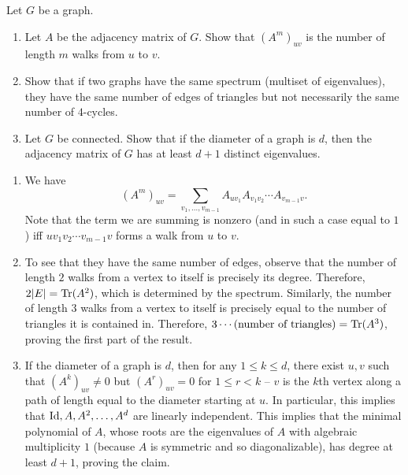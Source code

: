 \documentclass{article}
\begin{document}
	\begin{problem}
		Let $G$ be a graph.
		\begin{enumerate}[label=(\roman*)]
			\item Let $A$ be the adjacency matrix of $G$. Show that $(A^m)_{uv}$ is the number of length $m$ walks from $u$ to $v$.
			\item Show that if two graphs have the same spectrum (multiset of eigenvalues), they have the same number of edges of triangles but not necessarily the same number of $4$-cycles.
			\item Let $G$ be connected. Show that if the diameter of a graph is $d$, then the adjacency matrix of $G$ has at least $d+1$ distinct eigenvalues.
		\end{enumerate}
	\end{problem}
	\begin{solution*}
		\begin{enumerate}[label=(\roman*)]
			\item We have
			\[ (A^m)_{uv} = \sum_{v_1,\ldots,v_{m-1}} A_{uv_1} A_{v_1v_2} \cdots A_{v_{m-1}v}. \]
			Note that the term we are summing is nonzero (and in such a case equal to $1$) iff $uv_1v_2\cdots v_{m-1}v$ forms a walk from $u$ to $v$.

			\item To see that they have the same number of edges, observe that the number of length $2$ walks from a vertex to itself is precisely its degree. Therefore, $2|E| = \operatorname{Tr}(A^2)$, which is determined by the spectrum. Similarly, the number of length $3$ walks from a vertex to itself is precisely equal to the number of triangles it is contained in. Therefore, $3\cdots (\text{number of triangles}) = \operatorname{Tr}(A^3)$, proving the first part of the result.\\

			\item If the diameter of a graph is $d$, then for any $1 \le k \le d$, there exist $u,v$ such that $(A^k)_{uv} \ne 0$ but $(A^r)_{uv} = 0$ for $1 \le r < k$ -- $v$ is the $k$th vertex along a path of length equal to the diameter starting at $u$. In particular, this implies that $\operatorname{Id},A,A^2,\ldots,A^d$ are linearly independent.	This implies that the minimal polynomial of $A$, whose roots are the eigenvalues of $A$ with algebraic multiplicity $1$ (because $A$ is symmetric and so diagonalizable), has degree at least $d+1$, proving the claim.
		\end{enumerate}
	\end{solution*}
\end{document}
